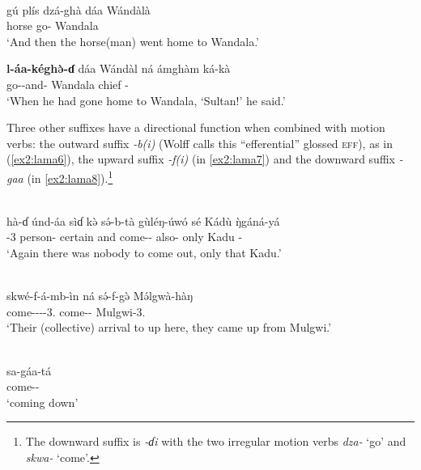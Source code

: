 \ea
{} \\
\ea\label{ex2:lama333}
\gll 
gú plís dzá-ghà dáa Wándàlà \\
 horse go-  Wandala \\
\glt `And then the horse(man) went home to Wandala.' 

\ex\label{ex2:lama3}
\gll \textbf{l-áa-kéghə̀-ɗ} dáa Wándàl ná ámghàm ká-kà \\
go--and-  Wandala  chief -	 \\
\glt `When he had gone home to Wandala, ‘Sultan!’ he said.'
\z
\z 

Three other suffixes have a directional function when combined with motion verbs: the outward suffix \textit{-b(i)} (Wolff calls this ``efferential'' glossed \textsc{eff}), as in (\ref{ex2:lama6}), the upward suffix \textit{-f(i)} (in \ref{ex2:lama7}) and the downward suffix \textit{-gaa} (in \ref{ex2:lama8}).\footnote{The downward suffix is \textit{-ɗi} with the two irregular motion verbs \textit{dza-} ‘go’ and \textit{skwa-} ‘come’.}

\ea\label{ex2:lama6}
 \\
\gll 
hà-ɗ únd-áa sìɗ kə̀ sə́-b-tà gùléŋ-úwó sé Kádù ŋ̀gáná-yá	\\
-3 person- certain and come-- also- only Kadu -		\\
\glt `Again there was nobody to come out, only that Kadu.'
\z

\ea\label{ex2:lama7}
 \\
\gll 
skwé-f-á-mb-ìn ná sə́-f-gə̀ Mə́lgwà-hàŋ	\\
come----3.  come-- Mulgwi-3.	\\
\glt `Their (collective) arrival to up here, they came up from Mulgwi.'
\z

\ea\label{ex2:lama8}
 \\
\gll 
sa-gáa-tá	\\
come-- \\
\glt `coming down'
\z

